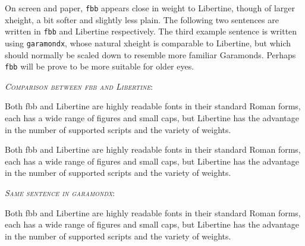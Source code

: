 \documentclass{article}
\begin{document}
On screen and paper, {\tt fbb} appears close in weight to Libertine, though of larger xheight, a bit softer and slightly less plain.  The following two sentences are written in {\tt fbb} and Libertine respectively. The third example sentence is written using {\tt garamondx}, whose natural xheight is comparable to Libertine, but which should normally be scaled down to resemble more familiar Garamonds. Perhaps {\tt fbb} will be prove to be more suitable for older eyes.

\textit{\textsc{Comparison between fbb and Libertine}}: 

Both fbb and Libertine are highly readable fonts in their standard Roman forms, each has a wide range of figures and small caps, but Libertine has the advantage in the number of supported scripts and the variety of weights.

{\selectfont Both fbb and Libertine are highly readable fonts in their standard Roman forms, each has a wide range of figures and small caps, but Libertine has the advantage in the number of supported scripts and the variety of weights.}

\textit{\textsc{Same sentence in garamondx}}: 

{\selectfont Both fbb and Libertine are highly readable fonts in their standard Roman forms, each has a wide range of figures and small caps, but Libertine has the advantage in the number of supported scripts and the variety of weights.}
\end{document}
